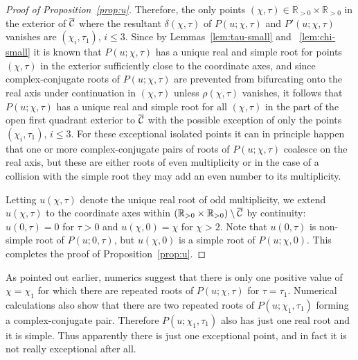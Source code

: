 \begin{proof}[Proof of Proposition~\ref{prop:u}]
Therefore, the only points $(\chi,\tau)\in\mathbb{R}_{> 0}\times\mathbb{R}_{> 0}$ in the exterior of $\overline{\mathcal{C}}$ where the resultant $\delta(\chi,\tau)$ of $P(u;\chi,\tau)$ and $P'(u;\chi,\tau)$ vanishes are $(\chi_i,\tau_1)$, $i\le 3$.  Since by Lemmas~\ref{lem:tau-small} and ~\ref{lem:chi-small} it is known that $P(u;\chi,\tau)$ has a unique real and simple root for points $(\chi,\tau)$ in the exterior sufficiently close to the coordinate axes, and since complex-conjugate roots of $P(u;\chi,\tau)$ are prevented from bifurcating onto the real axis under continuation in $(\chi,\tau)$ unless $\rho(\chi,\tau)$ vanishes, it follows that $P(u;\chi,\tau)$ has a unique real and simple root for all $(\chi,\tau)$ in the part of the open first quadrant exterior to $\overline{\mathcal{C}}$ with the possible exception of only the points $(\chi_i,\tau_1)$, $i\le 3$. For these exceptional isolated points it can in principle happen that one or more complex-conjugate pairs of roots of $P(u;\chi,\tau)$ coalesce on the real axis, but these are either roots of even multiplicity or in the case of a collision with the simple root they may add an even number to its multiplicity.

Letting $u(\chi,\tau)$ denote the unique real root of odd multiplicity, we extend $u(\chi,\tau)$ to the coordinate axes within $(\mathbb{R}_{>0}\times\mathbb{R}_{>0})\setminus\overline{\mathcal{C}}$ by continuity:  $u(0,\tau)=0$ for $\tau>0$ and $u(\chi,0)=\chi$ for $\chi>2$.  Note that $u(0,\tau)$ is non-simple root of $P(u;0,\tau)$, but $u(\chi,0)$ is a simple root of $P(u;\chi,0)$.  This completes the proof of Proposition~\ref{prop:u}.
\end{proof}

\begin{remark}
As pointed out earlier, numerics suggest that there is only one positive value of $\chi=\chi_1$ for which there are repeated roots of $P(u;\chi,\tau)$ for $\tau=\tau_1$.  Numerical calculations also show that there are two repeated roots of $P(u;\chi_1,\tau_1)$ forming a complex-conjugate pair.  Therefore $P(u;\chi_1,\tau_1)$ also has just one real root and it is simple.  Thus apparently there is just one exceptional point, and in fact it is not really exceptional after all.
\end{remark}

